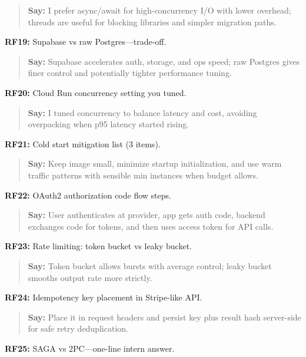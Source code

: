 \documentclass[9pt,a4paper]{article}
\begin{document}
\begin{quote}\small\textbf{Say:} I prefer async/await for high-concurrency I/O with lower overhead; threads are useful for blocking libraries and simpler migration paths.\end{quote}
\vspace{2mm}
\textbf{RF19:} Supabase vs raw Postgres---trade-off.

\begin{quote}\small\textbf{Say:} Supabase accelerates auth, storage, and ops speed; raw Postgres gives finer control and potentially tighter performance tuning.\end{quote}
\vspace{2mm}
\textbf{RF20:} Cloud Run concurrency setting you tuned.

\begin{quote}\small\textbf{Say:} I tuned concurrency to balance latency and cost, avoiding overpacking when p95 latency started rising.\end{quote}
\vspace{2mm}
\textbf{RF21:} Cold start mitigation list (3 items).

\begin{quote}\small\textbf{Say:} Keep image small, minimize startup initialization, and use warm traffic patterns with sensible min instances when budget allows.\end{quote}
\vspace{2mm}
\textbf{RF22:} OAuth2 authorization code flow steps.

\begin{quote}\small\textbf{Say:} User authenticates at provider, app gets auth code, backend exchanges code for tokens, and then uses access token for API calls.\end{quote}
\vspace{2mm}
\textbf{RF23:} Rate limiting: token bucket vs leaky bucket.

\begin{quote}\small\textbf{Say:} Token bucket allows bursts with average control; leaky bucket smooths output rate more strictly.\end{quote}
\vspace{2mm}
\textbf{RF24:} Idempotency key placement in Stripe-like API.

\begin{quote}\small\textbf{Say:} Place it in request headers and persist key plus result hash server-side for safe retry deduplication.\end{quote}
\vspace{2mm}
\textbf{RF25:} SAGA vs 2PC---one-line intern answer.
\end{document}
